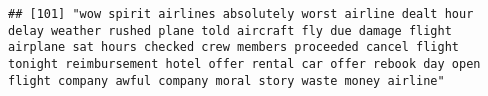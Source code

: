\documentclass[
]{article}
\begin{document}
\begin{verbatim}
## [101] "wow spirit airlines absolutely worst airline dealt hour delay weather rushed plane told aircraft fly due damage flight airplane sat hours checked crew members proceeded cancel flight tonight reimbursement hotel offer rental car offer rebook day open flight company awful company moral story waste money airline"                                                                                                                                                                                                                                                                                                                                                                                                                                                                                                                                                                                                                                                                                                                                                                                                                                                                                                                                                                                                                                                                                                                                                                                                                                                                                                                                                                                                                                                                        

\end{verbatim}
\end{document}
